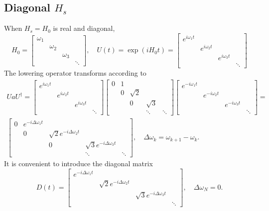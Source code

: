 \documentclass[11pt]{article}
\begin{document}
\subsection{Diagonal $H_s$}
When $H_s=H_0$ is real and diagonal,
\[
H_0=\begin{bmatrix}
\omega_1 & & &\\
& \omega_2 &&\\
& & \omega_3 &\\
& & & \ddots
\end{bmatrix},\quad
%
U(t) = \exp(i H_0 t)=
\begin{bmatrix}
e^{i\omega_1 t} & & &\\
& e^{i\omega_2 t} &&\\
& & e^{i\omega_3 t} &\\
& & & \ddots
\end{bmatrix}
\]
The lowering operator transforms according to
\begin{multline*}
UaU^\dag =
\begin{bmatrix}
  e^{i\omega_1 t} & & & \\
  & e^{i\omega_2 t} & & \\
  & &  e^{i\omega_3 t} & \\
  & & & \ddots
\end{bmatrix}
\begin{bmatrix}
0 & 1 & & &\\
 & 0 & \sqrt{2} & &\\
&  & 0 & \sqrt{3} &\\
& &  & \ddots & \ddots
\end{bmatrix}
\begin{bmatrix}
  e^{-i\omega_1 t} & & & \\
  & e^{-i\omega_2 t} & & \\
  & &  e^{-i\omega_3 t} & \\
  & & & \ddots
\end{bmatrix} = \\
%
\begin{bmatrix}
0 & e^{-i\Delta\omega_1 t} & & &\\
 & 0 & \sqrt{2} e^{-i\Delta\omega_2 t}& &\\
&  & 0 & \sqrt{3} e^{-i\Delta\omega_3 t}  &\\
& &  & \ddots & \ddots
\end{bmatrix},\quad \Delta\omega_k = \omega_{k+1} - \omega_k.
%
\end{multline*}
It is convenient to introduce the diagonal matrix
\[
D(t) = \begin{bmatrix}
 e^{-i\Delta\omega_1 t} & & &\\
  & \sqrt{2} e^{-i\Delta\omega_2 t}& &\\
&  & \sqrt{3} e^{-i\Delta\omega_3 t}  &\\
&  &   & \ddots
\end{bmatrix},\quad \Delta\omega_N = 0.
\]
\end{document}
